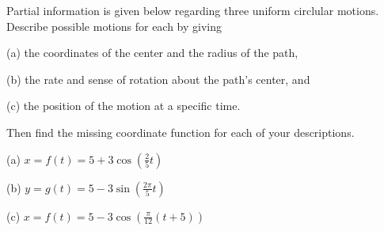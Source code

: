 \documentclass{ximera}
\begin{document}
\begin{question} \label{Q3:Cosine}
Partial information is given below regarding three uniform circlular motions. Describe possible motions for each by giving

(a) the coordinates of the center and the radius of the path,

(b) the rate and sense of rotation about the path's center, and

(c) the position of the motion at a specific time.

Then find the missing coordinate function for each of your descriptions.

(a) $x=f(t) = 5 + 3 \cos \left( \frac{2}{5}t \right)$

(b) $y = g(t) = 5 - 3 \sin \left( \frac{2\pi}{5}t \right)$

(c) $x=f(t) = 5 - 3 \cos \left( \frac{\pi}{12}\left( t+5 \right) \right)$


\end{question}
\end{document}
